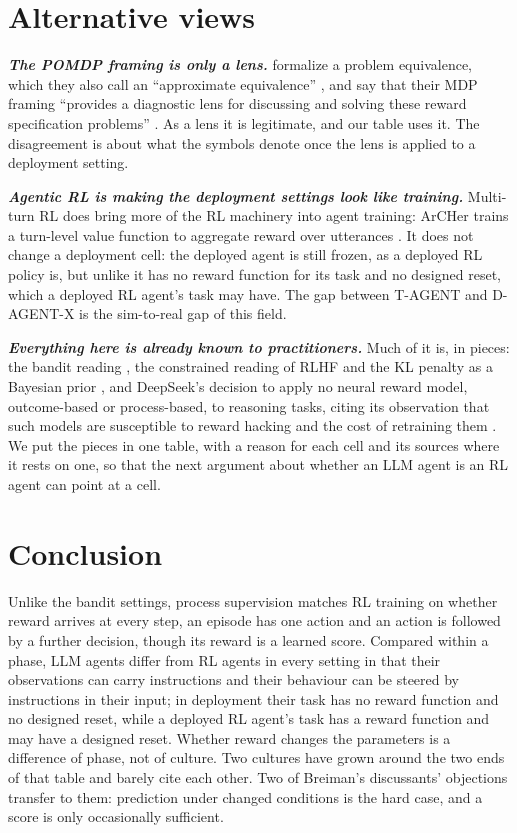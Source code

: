 \documentclass{article}
\begin{document}
\hypertarget{sec:alternatives}{%
\section{Alternative views}\label{sec:alternatives}}

\textbf{\emph{The POMDP framing is only a lens.}} \citet{mclean2026} formalize a problem equivalence, which they also call an ``approximate equivalence'' \citep{mclean2026}, and say that their MDP framing ``provides a diagnostic lens for discussing and solving these reward specification problems'' \citep{mclean2026}. As a lens it is legitimate, and our table uses it. The disagreement is about what the symbols denote once the lens is applied to a deployment setting.

\textbf{\emph{Agentic RL is making the deployment settings look like training.}} Multi-turn RL does bring more of the RL machinery into agent training: ArCHer trains a turn-level value function to aggregate reward over utterances \citep{zhou2024b}. It does not change a deployment cell: the deployed agent is still frozen, as a deployed RL policy is, but unlike it has no reward function for its task and no designed reset, which a deployed RL agent's task may have. The gap between T-AGENT and D-AGENT-X is the sim-to-real gap of this field.

\textbf{\emph{Everything here is already known to practitioners.}} Much of it is, in pieces: the bandit reading \citep{ahmadian2024, lambert2025}, the constrained reading of RLHF \citep{moskovitz2024} and the KL penalty as a Bayesian prior \citep{korbak2022}, and DeepSeek's decision to apply no neural reward model, outcome-based or process-based, to reasoning tasks, citing its observation that such models are susceptible to reward hacking and the cost of retraining them \citep{deepseekai2025}. We put the pieces in one table, with a reason for each cell and its sources where it rests on one, so that the next argument about whether an LLM agent is an RL agent can point at a cell.

\hypertarget{sec:conclusion}{%
\section{Conclusion}\label{sec:conclusion}}

Unlike the bandit settings, process supervision matches RL training on whether reward arrives at every step, an episode has one action and an action is followed by a further decision, though its reward is a learned score. Compared within a phase, LLM agents differ from RL agents in every setting in that their observations can carry instructions and their behaviour can be steered by instructions in their input; in deployment their task has no reward function and no designed reset, while a deployed RL agent's task has a reward function and may have a designed reset. Whether reward changes the parameters is a difference of phase, not of culture. Two cultures have grown around the two ends of that table and barely cite each other. Two of Breiman's discussants' objections transfer to them: prediction under changed conditions is the hard case, and a score is only occasionally sufficient.
\end{document}
